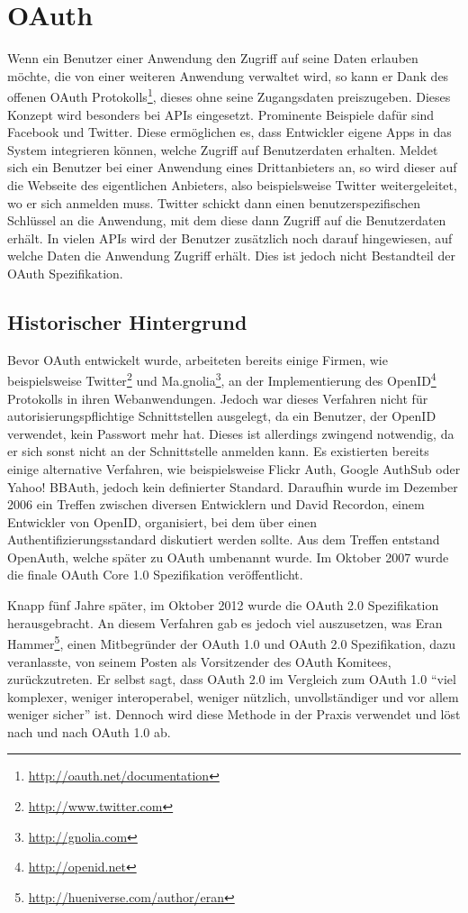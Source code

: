 \section{OAuth}
\label{oautheinleitung}
Wenn ein Benutzer einer Anwendung den Zugriff auf seine Daten erlauben möchte, die von einer weiteren Anwendung verwaltet wird, so kann er Dank des offenen OAuth Protokolls\footnote{\url{http://oauth.net/documentation}}, dieses ohne seine Zugangsdaten preiszugeben.
Dieses Konzept wird besonders bei \acp{API} eingesetzt.
Prominente Beispiele dafür sind Facebook und Twitter.
Diese ermöglichen es, dass Entwickler eigene \acp{App} in das System integrieren können, welche Zugriff auf Benutzerdaten erhalten.
Meldet sich ein Benutzer bei einer Anwendung eines Drittanbieters an, so wird dieser auf die Webseite des eigentlichen Anbieters, also beispielsweise Twitter weitergeleitet, wo er sich anmelden muss.
Twitter schickt dann einen benutzerspezifischen Schlüssel an die Anwendung, mit dem diese dann Zugriff auf die Benutzerdaten erhält.
In vielen \acp{API} wird der Benutzer zusätzlich noch darauf hingewiesen, auf welche Daten die Anwendung Zugriff erhält.
Dies ist jedoch nicht Bestandteil der OAuth Spezifikation.

\subsection{Historischer Hintergrund}
Bevor OAuth entwickelt wurde, arbeiteten bereits einige Firmen, wie beispielsweise Twitter\footnote{\url{http://www.twitter.com}} und Ma.gnolia\footnote{\url{http://gnolia.com}}, an der Implementierung des OpenID\footnote{\url{http://openid.net}} Protokolls in ihren Webanwendungen.
Jedoch war dieses Verfahren nicht für autorisierungspflichtige Schnittstellen ausgelegt, da ein Benutzer, der OpenID verwendet, kein Passwort mehr hat.
Dieses ist allerdings zwingend notwendig, da er sich sonst nicht an der Schnittstelle anmelden kann.
Es existierten bereits einige alternative Verfahren, wie beispielsweise Flickr Auth, Google AuthSub oder Yahoo! BBAuth, jedoch kein definierter Standard.
Daraufhin wurde im Dezember 2006 ein Treffen zwischen diversen Entwicklern und David Recordon, einem Entwickler von OpenID, organisiert, bei dem über einen Authentifizierungsstandard diskutiert werden sollte.
Aus dem Treffen entstand OpenAuth, welche später zu OAuth umbenannt wurde.
Im Oktober 2007 wurde die finale OAuth Core 1.0 Spezifikation veröffentlicht\cite[vgl.][]{oauth11}.

Knapp fünf Jahre später, im Oktober 2012 wurde die OAuth 2.0 Spezifikation herausgebracht\cite[vgl.][]{oauth12}.
An diesem Verfahren gab es jedoch viel auszusetzen, was Eran Hammer\footnote{\url{http://hueniverse.com/author/eran}}, einen Mitbegründer der OAuth 1.0 und OAuth 2.0 Spezifikation, dazu veranlasste, von seinem Posten als Vorsitzender des OAuth Komitees, zurückzutreten\cite[vgl.][]{eran10}.
Er selbst sagt, dass OAuth 2.0 im Vergleich zum OAuth 1.0 "`viel komplexer, weniger interoperabel, weniger nützlich, unvollständiger und vor allem weniger sicher"'\cite{eran12} ist.
Dennoch wird diese Methode in der Praxis verwendet und löst nach und nach OAuth 1.0 ab.

